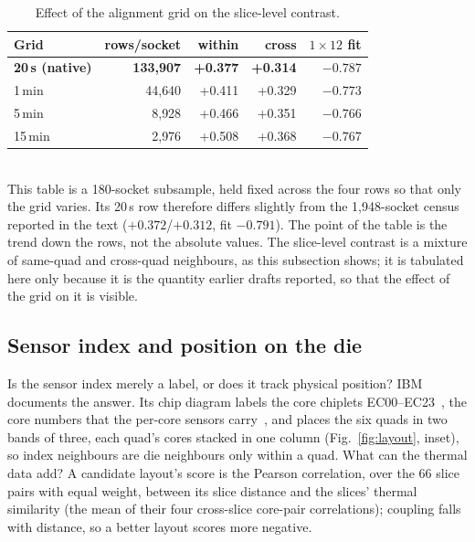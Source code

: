 \documentclass[10pt,conference]{IEEEtran}
\begin{document}
\begin{table}[h]\centering\caption{Effect of the alignment grid on the slice-level contrast.}
\label{tab:grid}\footnotesize
\begin{tabular}{lrrrr}\toprule
Grid & rows/socket & within & cross & $1\times12$ fit\\\midrule
\textbf{20\,s (native)} & \textbf{133{,}907} & \textbf{+0.377} & \textbf{+0.314} & \textbf{$-0.787$}\\
1\,min & 44{,}640 & +0.411 & +0.329 & $-0.773$\\
5\,min & 8{,}928 & +0.466 & +0.351 & $-0.766$\\
15\,min & 2{,}976 & +0.508 & +0.368 & $-0.767$\\
\bottomrule\end{tabular}
\\[2pt]\footnotesize This table is a 180-socket subsample, held fixed across the four rows so
that only the grid varies. Its 20\,s row therefore differs slightly from the 1{,}948-socket
census reported in the text ($+0.372$/$+0.312$, fit $-0.791$). The point of the table is the
trend down the rows, not the absolute values. The slice-level contrast is a mixture of same-quad
and cross-quad neighbours, as this subsection shows; it is tabulated here only because it is the
quantity earlier drafts reported, so that the effect of the grid on it is visible.
\end{table}


\subsection{Sensor index and position on the die}
\label{sec:layout}
Is the sensor index merely a label, or does it track physical position? IBM documents the answer.
Its chip diagram labels the core chiplets EC00--EC23~\cite[Fig.~2, p.~33]{ibm_p9regs}, the core numbers that the
per-core sensors carry~\cite{smith2020p9layout}, and places the six quads in two bands of three,
each quad's cores stacked in one column (Fig.~\ref{fig:layout}, inset), so index neighbours are die
neighbours only within a quad. What can the thermal data add? A candidate layout's score is the
Pearson correlation, over the 66 slice pairs with equal weight, between its slice distance and the
slices' thermal similarity (the mean of their four cross-slice core-pair correlations); coupling
falls with distance, so a better layout scores more negative.
\end{document}
